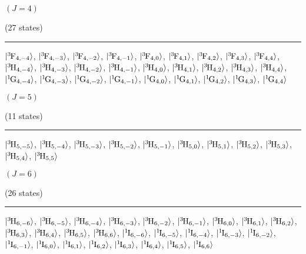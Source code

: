 \begin{mdframed}
\begin{center}
$(J=4)$

(27 states)
\vspace{0.25cm}
\hrule
\vspace{0.25cm}
$\ket{\LSterm{3}{F}_{4,-4}}$, $\ket{\LSterm{3}{F}_{4,-3}}$, $\ket{\LSterm{3}{F}_{4,-2}}$, $\ket{\LSterm{3}{F}_{4,-1}}$, $\ket{\LSterm{3}{F}_{4,0}}$, $\ket{\LSterm{3}{F}_{4,1}}$, $\ket{\LSterm{3}{F}_{4,2}}$, $\ket{\LSterm{3}{F}_{4,3}}$, $\ket{\LSterm{3}{F}_{4,4}}$, $\ket{\LSterm{3}{H}_{4,-4}}$, $\ket{\LSterm{3}{H}_{4,-3}}$, $\ket{\LSterm{3}{H}_{4,-2}}$, $\ket{\LSterm{3}{H}_{4,-1}}$, $\ket{\LSterm{3}{H}_{4,0}}$, $\ket{\LSterm{3}{H}_{4,1}}$, $\ket{\LSterm{3}{H}_{4,2}}$, $\ket{\LSterm{3}{H}_{4,3}}$, $\ket{\LSterm{3}{H}_{4,4}}$, $\ket{\LSterm{1}{G}_{4,-4}}$, $\ket{\LSterm{1}{G}_{4,-3}}$, $\ket{\LSterm{1}{G}_{4,-2}}$, $\ket{\LSterm{1}{G}_{4,-1}}$, $\ket{\LSterm{1}{G}_{4,0}}$, $\ket{\LSterm{1}{G}_{4,1}}$, $\ket{\LSterm{1}{G}_{4,2}}$, $\ket{\LSterm{1}{G}_{4,3}}$, $\ket{\LSterm{1}{G}_{4,4}}$
\end{center}
\end{mdframed}

\begin{mdframed}
\begin{center}
$(J=5)$

(11 states)
\vspace{0.25cm}
\hrule
\vspace{0.25cm}
$\ket{\LSterm{3}{H}_{5,-5}}$, $\ket{\LSterm{3}{H}_{5,-4}}$, $\ket{\LSterm{3}{H}_{5,-3}}$, $\ket{\LSterm{3}{H}_{5,-2}}$, $\ket{\LSterm{3}{H}_{5,-1}}$, $\ket{\LSterm{3}{H}_{5,0}}$, $\ket{\LSterm{3}{H}_{5,1}}$, $\ket{\LSterm{3}{H}_{5,2}}$, $\ket{\LSterm{3}{H}_{5,3}}$, $\ket{\LSterm{3}{H}_{5,4}}$, $\ket{\LSterm{3}{H}_{5,5}}$
\end{center}
\end{mdframed}

\begin{mdframed}
\begin{center}
$(J=6)$

(26 states)
\vspace{0.25cm}
\hrule
\vspace{0.25cm}
$\ket{\LSterm{3}{H}_{6,-6}}$, $\ket{\LSterm{3}{H}_{6,-5}}$, $\ket{\LSterm{3}{H}_{6,-4}}$, $\ket{\LSterm{3}{H}_{6,-3}}$, $\ket{\LSterm{3}{H}_{6,-2}}$, $\ket{\LSterm{3}{H}_{6,-1}}$, $\ket{\LSterm{3}{H}_{6,0}}$, $\ket{\LSterm{3}{H}_{6,1}}$, $\ket{\LSterm{3}{H}_{6,2}}$, $\ket{\LSterm{3}{H}_{6,3}}$, $\ket{\LSterm{3}{H}_{6,4}}$, $\ket{\LSterm{3}{H}_{6,5}}$, $\ket{\LSterm{3}{H}_{6,6}}$, $\ket{\LSterm{1}{I}_{6,-6}}$, $\ket{\LSterm{1}{I}_{6,-5}}$, $\ket{\LSterm{1}{I}_{6,-4}}$, $\ket{\LSterm{1}{I}_{6,-3}}$, $\ket{\LSterm{1}{I}_{6,-2}}$, $\ket{\LSterm{1}{I}_{6,-1}}$, $\ket{\LSterm{1}{I}_{6,0}}$, $\ket{\LSterm{1}{I}_{6,1}}$, $\ket{\LSterm{1}{I}_{6,2}}$, $\ket{\LSterm{1}{I}_{6,3}}$, $\ket{\LSterm{1}{I}_{6,4}}$, $\ket{\LSterm{1}{I}_{6,5}}$, $\ket{\LSterm{1}{I}_{6,6}}$
\end{center}
\end{mdframed}